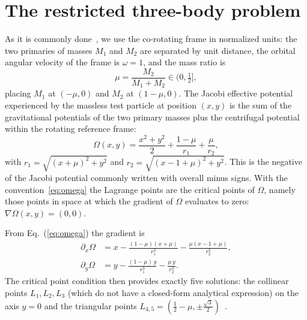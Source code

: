 \documentclass[aip,preprint,amsmath,amssymb,floatfix]{revtex4-2}
\begin{document}
\section{The restricted three-body problem}\label{sec:rtbp}

As it is commonly done~\cite{szebehely1967,Koon}, we use the co-rotating frame in normalized units: the two primaries of masses $M_1$ and $M_2$ are separated by
unit distance, the orbital angular velocity of the frame is $\omega=1$, and the mass
ratio is
\begin{equation}
  \mu = \frac{M_2}{M_1+M_2}\in(0,\tfrac12],
\end{equation}
placing $M_1$ at $(-\mu,0)$ and $M_2$ at $(1-\mu,0)$.  The Jacobi effective potential experienced by the massless test particle at position $(x,y)$ is the sum of the gravitational potentials of the two primary masses plus the centrifugal potential within the rotating reference frame:
\begin{equation}
  \Omega(x,y)=\frac{x^2+y^2}{2}+\frac{1-\mu}{r_1}+\frac{\mu}{r_2},
  \label{eq:omega}
\end{equation}
with $r_1=\sqrt{(x+\mu)^2+y^2}$ and $r_2=\sqrt{(x-1+\mu)^2+y^2}$. This is the
negative of the Jacobi potential commonly written with overall minus signs. With the
convention~\eqref{eq:omega} the Lagrange points are the critical points of $\Omega$, namely those points in space at which the gradient of $\Omega$ evaluates to zero: 
$\nabla\Omega(x,y)=(0,0)$.

From Eq.~(\ref{eq:omega}) the gradient is
\begin{align}
  \partial_x\Omega &= x-\frac{(1-\mu)(x+\mu)}{r_1^3}-\frac{\mu(x-1+\mu)}{r_2^3},
  \label{eq:gx}\\
  \partial_y\Omega &= y-\frac{(1-\mu)\,y}{r_1^3}-\frac{\mu\,y}{r_2^3}.
  \label{eq:gy}
\end{align}
The critical point condition then provides exactly five solutions: the collinear points $L_1,L_2,L_3$ (which do not have a closed-form analytical expression) on the axis $y=0$ and the
triangular points $L_{4,5}=(\tfrac12-\mu,\pm\tfrac{\sqrt3}{2})$~\cite{szebehely1967,Koon}.
\end{document}
